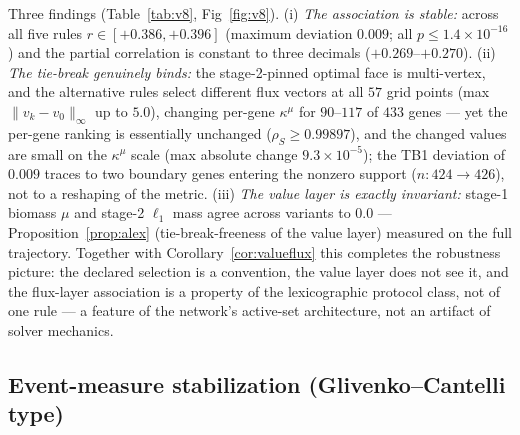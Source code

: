 \documentclass[11pt,a4paper]{article}
\theoremstyle{plain}
\theoremstyle{definition}
\theoremstyle{remark}
\newcommand{\kmu}{\kappa^{\mu}}
\begin{document}
Three findings (Table~\ref{tab:v8}, Fig~\ref{fig:v8}). (i) \emph{The association is
stable:} across all five rules $r \in [+0.386, +0.396]$ (maximum
deviation $0.009$; all $p \le 1.4 \times 10^{-16}$) and the partial
correlation is constant to three decimals ($+0.269$--$+0.270$). (ii)
\emph{The tie-break genuinely binds:} the stage-2-pinned optimal face
is multi-vertex, and the alternative rules select different flux
vectors at all $57$ grid points (max $\|v_k - v_0\|_\infty$ up to
$5.0$), changing per-gene $\kmu$ for $90$--$117$ of $433$ genes ---
yet the per-gene ranking is essentially unchanged
($\rho_S \ge 0.99897$), and the changed values are small on the
$\kmu$ scale (max absolute change $9.3 \times 10^{-5}$); the TB1
deviation of $0.009$ traces to two boundary genes entering the
nonzero support ($n: 424 \to 426$), not to a reshaping of the metric.
(iii) \emph{The value layer is exactly invariant:} stage-1 biomass
$\mu$ and stage-2 $\ell_1$ mass agree across variants to $0.0$ ---
Proposition~\ref{prop:alex} (tie-break-freeness of the value layer)
measured on the full trajectory. Together with
Corollary~\ref{cor:valueflux} this completes the robustness picture: the
declared selection is a convention, the value layer does not see it,
and the flux-layer association is a property of the lexicographic
protocol class, not of one rule --- a feature of the network's
active-set architecture, not an artifact of solver mechanics.

\subsection{Event-measure stabilization
(Glivenko--Cantelli type)}\label{sec:e32}
\end{document}
